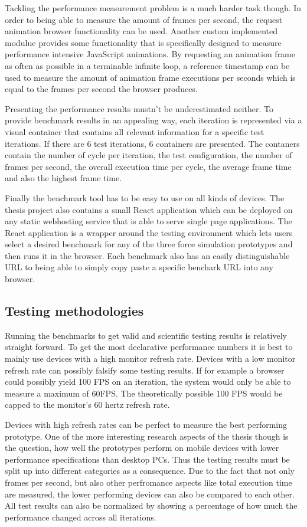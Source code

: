 Tackling the performance measurement problem is a much harder task though. In order to being able to measure the amount of frames per second, the request animation browser functionality can be used. Another custom implemented modulue provides some functionality that is specifically designed to measure performance intensive JavaScript animations. By requesting an animation frame as often as possible in a terminable infinite loop, a reference timestamp can be used to measure the amount of animation frame executions per seconds which is equal to the frames per second the browser produces.

Presenting the performance results mustn't be underestimated neither. To provide benchmark results in an appealing way, each iteration is represented via a visual container that contains all relevant information for a specific test iterations. If there are 6 test iterations, 6 containers are presented. The contaners contain the number of cycle per iteration, the test configuration, the number of frames per second, the overall execution time per cycle, the average frame time and also the highest frame time.

Finally the benchmark tool has to be easy to use on all kinds of devices. The thesis project also contains a small React application which can be deployed on any static webhosting service that is able to serve single page applications. The React application is a wrapper around the testing environment which lets users select a desired benchmark for any of the three force simulation prototypes and then runs it in the browser. Each benchmark also has an easily distinguishable URL to being able to simply copy paste a specific benchark URL into any browser.

\subsection{Testing methodologies}

Running the benchmarks to get valid and scientific testing results is relatively straight forward. To get the most declarative performance numbers it is best to mainly use devices with a high monitor refresh rate. Devices with a low monitor refresh rate can possibly falsify some testing results. If for example a browser could possibly yield 100 FPS on an iteration, the system would only be able to measure a maximum of 60FPS. The theoretically possible 100 FPS would be capped to the monitor's 60 hertz refresh rate.

Devices with high refresh rates can be perfect to measure the best performing prototype. One of the more interesting research aspects of the thesis though is the question, how well the prototypes perform on mobile devices with lower performance specifications than desktop PCs. Thus the testing results must be split up into different categories as a consequence. Due to the fact that not only frames per second, but also other perfromance aspects like total execution time are measured, the lower performing devices can also be compared to each other. All test results can also be normalized by showing a percentage of how much the performance changed across all iterations.

